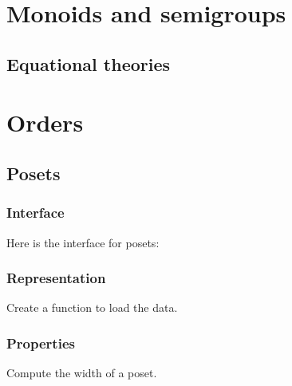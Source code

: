\chapter{Monoids and semigroups}


\section{Equational theories}



\chapter{Orders}


\section{Posets}


\begin{figure}

  \caption{}
  \label{fig:poset_finiteposet}
\end{figure}


\subsection*{Interface}

Here is the interface for posets:

%

\subsection*{Representation}


\begin{gradedexercise}[Representation]
  Create a function to load the data.


%

\end{gradedexercise}

\subsection{Properties}


\begin{gradedexercise}
  Compute the width of a poset.
\end{gradedexercise}

